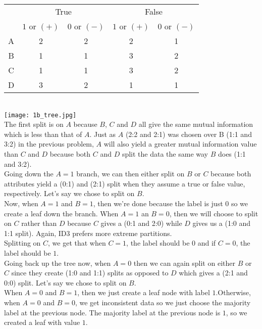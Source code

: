\documentclass[12pt,letterpaper]{article}
\begin{document}
\begin{enumerate}
\begin{enumerate}
        \begin{tabular}{    
      c
      c
      c
      c
            c
    }\toprule
      \multirow{2}{*}{} & \multicolumn{2}{c}{True} & \multicolumn{2}{c}{False} \\ \cmidrule(r){2-3} \cmidrule(){4-5}
        &{$1$ or $(+)$} & {$0$ or $(-)$}  &{$1$ or $(+)$} & {$0$ or $(-)$} \\ \midrule
      A & 2     & 2    & 2      & 1    \\
      B & 1    & 1     & 3     & 2    \\
      C & 1     & 1     & 3      & 2     \\
      D & 3     & 2     & 1    & 1   \\
       \bottomrule 
    \end{tabular}\medskip  \\
    \texttt{[image: 1b\_tree.jpg]} \\
    The first split is on $A$ because $B$, $C$ and $D$ all give the same mutual information which is less than that of $A$. Just as $A$ (2:2 and 2:1) was chosen over B (1:1 and 3:2) in the previous problem, $A$ will also yield a greater mutual information value than $C$ and $D$ because both $C$ and $D$ split the data the same way $B$ does (1:1 and 3:2).  \\

    Going down the $A=1$ branch, we can then either split on $B$ or $C$ because both attributes yield a (0:1) and (2:1) split when they assume a true or false value, respectively. Let's say we chose to split on $B$. \\

        Now, when $A=1$ and $B=1$, then we're done because the label is just $0$ so we create a leaf down the branch. When $A=1$ an $B=0$, then we will choose to split on $C$  rather than $D$  because $C$ gives a (0:1 and 2:0) while $D$ gives us a (1:0 and 1:1 split). Again, ID3 prefers more extreme partitions. \\

        Splitting on $C$, we get that when $C=1$, the label should be $0$ and if $C=0$, the label should be $1$. \\

      Going back up the tree now, when $A=0$ then we can again split on either $B$ or $C$ since they create (1:0 and 1:1) splits as opposed to $D$ which gives a (2:1 and 0:0) split. Let's say we chose to split on $B$. \\

       When $A=0$ and $B=1$, then we just create a leaf node with label $1$.Otherwise, when $A=0$ and $B=0$, we get inconsistent data so we just choose the majority label at the previous node. The majority label at the previous node is $1$, so we created a leaf with value $1$. \\


\end{enumerate}
\end{enumerate}
\end{document}
